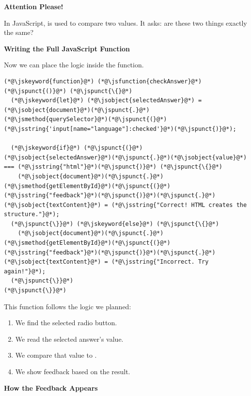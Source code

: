 \documentclass{article}
\begin{document}
\vspace{0.3cm}

\begin{attentionbox}
  \textbf{\Bitter\textcolor{naranja}{Attention Please!}}

  In JavaScript, \inlinejsmethod{===} is used to compare two values.
  It asks: are these two things exactly the same?
\end{attentionbox}

\vspace{0.4cm}

\textbf{\Bitter\textcolor{naranja}{Writing the Full JavaScript Function}}

\vspace{0.1cm}

Now we can place the logic inside the function.

\vspace{0.2cm}

\begin{lstlisting}
(*@\jskeyword{function}@*) (*@\jsfunction{checkAnswer}@*)(*@\jspunct{()}@*) (*@\jspunct{\{}@*)
  (*@\jskeyword{let}@*) (*@\jsobject{selectedAnswer}@*) = (*@\jsobject{document}@*)(*@\jspunct{.}@*)(*@\jsmethod{querySelector}@*)(*@\jspunct{(}@*)(*@\jsstring{'input[name="language"]:checked'}@*)(*@\jspunct{)}@*);

  (*@\jskeyword{if}@*) (*@\jspunct{(}@*)(*@\jsobject{selectedAnswer}@*)(*@\jspunct{.}@*)(*@\jsobject{value}@*) === (*@\jsstring{"html"}@*)(*@\jspunct{)}@*) (*@\jspunct{\{}@*)
    (*@\jsobject{document}@*)(*@\jspunct{.}@*)(*@\jsmethod{getElementById}@*)(*@\jspunct{(}@*)(*@\jsstring{"feedback"}@*)(*@\jspunct{)}@*)(*@\jspunct{.}@*)(*@\jsobject{textContent}@*) = (*@\jsstring{"Correct! HTML creates the structure."}@*);
  (*@\jspunct{\}}@*) (*@\jskeyword{else}@*) (*@\jspunct{\{}@*)
    (*@\jsobject{document}@*)(*@\jspunct{.}@*)(*@\jsmethod{getElementById}@*)(*@\jspunct{(}@*)(*@\jsstring{"feedback"}@*)(*@\jspunct{)}@*)(*@\jspunct{.}@*)(*@\jsobject{textContent}@*) = (*@\jsstring{"Incorrect. Try again!"}@*);
  (*@\jspunct{\}}@*)
(*@\jspunct{\}}@*)
\end{lstlisting}

\vspace{0.3cm}

This function follows the logic we planned:

\begin{enumerate}[leftmargin=1.2cm, itemsep=4pt]
  \item We find the selected radio button.
  \item We read the selected answer's value.
  \item We compare that value to .
  \item We show feedback based on the result.
\end{enumerate}
\pagebreak
\textbf{\Bitter\textcolor{naranja}{How the Feedback Appears}}
\end{document}
